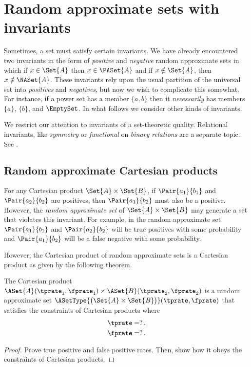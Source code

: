 \documentclass[ ../main.tex]{subfiles}
\begin{document}
\section{Random approximate sets with invariants}
Sometimes, a set must satisfy certain invariants.
We have already encountered two invariants in the form of \emph{positive} and \emph{negative} random approximate sets in which if $x \in \Set{A}$ then $x \in \PASet{A}$ and if $x \notin \Set{A}$, then $x \notin \NASet{A}$.
These invariants rely upon the usual partition of the universal set into \emph{positives} and \emph{negatives}, but now we wish to complicate this somewhat.
For instance, if a power set has a member $\{a,b\}$ then it \emph{necessarily} has members $\{a\}$, $\{b\}$, and $\EmptySet$.
In what follows we consider other kinds of invariants.

We restrict our attention to invariants of a set-theoretic quality.
Relational invariants, like \emph{symmetry} or \emph{functional} on \emph{binary relations} are a separate topic. See \cite{approxrel}.

\subsection{Random approximate Cartesian products}
For any Cartesian product $\Set{A} \times \Set{B}$, if $\Pair{a_1}{b_1}$ and $\Pair{a_2}{b_2}$ are positives, then $\Pair{a_1}{b_2}$ must also be a positive.
However, the \emph{random approximate set} of $\Set{A} \times \Set{B}$ may generate a set that violates this invariant.
For example, in the random approximate set $\Pair{a_1}{b_1}$ and $\Pair{a_2}{b_2}$ will be true positives with some probability and $\Pair{a_1}{b_2}$ will be a false negative with some probability.

However, the Cartesian product of random approximate sets is a Cartesian product as given by the following theorem.
\begin{theorem}
	The Cartesian product $\ASet{A}(\tprate_1,\fprate_1) \times \ASet{B}(\tprate_2,\fprate_2)$ is a random approximate set $\ASetType{\left(\Set{A} \times \Set{B}\right)}(\tprate,\fprate)$ that satisfies the constraints of Cartesian products where
	\begin{equation}
	\begin{split}
	\tprate &= ?\,,\\
	\fprate &= ?\,.
	\end{split}
	\end{equation}
\end{theorem}
\begin{proof}
	Prove true positive and false positive rates.
	Then, show how it obeys the constraints of Cartesian products.
\end{proof}
\end{document}
